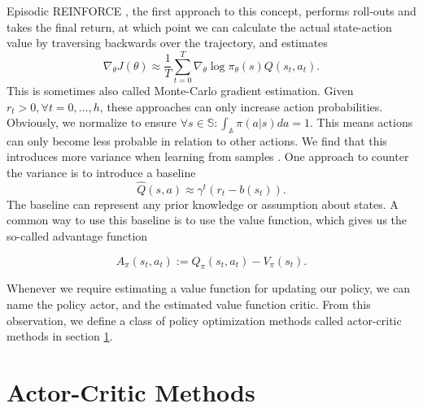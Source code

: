 Episodic REINFORCE \cite{Williams92simplestatistical}, the first approach to this concept, performs roll-outs and takes the final return, at which point we can calculate the actual state-action value by traversing backwards over the trajectory, and estimates
\begin{equation}
  \nabla_\theta J(\theta) \approx \frac{1}{T} \sum_{t=0}^T \nabla_\theta\log\pi_\theta(s) Q(s_t,a_t).
\end{equation}
This is sometimes also called Monte-Carlo gradient estimation. 
Given $r_t > 0, \forall t=0,\dots,h$, these approaches can only increase action probabilities. 
Obviously, we normalize to ensure $\forall s \in \mathbb{S}: \int_\mathbb{A}{\pi(a|s)da} = 1$. 
This means actions can only become less probable in relation to other actions. 
We find that this introduces more variance when learning from samples \cite{Sutton:1999:PGM:3009657.3009806}. 
One approach to counter the variance is to introduce a baseline
\begin{equation}
  \hat{Q}(s,a) \approx \gamma^{t} (r_{t} - b(s_t)).
\end{equation}
The baseline can represent any prior knowledge or assumption about states. 
A common way to use this baseline is to use the value function, which gives us the so-called advantage function

\begin{equation}
	A_{\pi}(s_t, a_t) := Q_{\pi}(s_t, a_t) - V_{\pi}(s_t).
	\label{eqn:adv}
\end{equation}

Whenever we require estimating a value function for updating our policy, we can name the policy actor, and the estimated value function critic. 
From this observation, we define a class of policy optimization methods called actor-critic methods in section \ref{sec:ac}.


\section{Actor-Critic Methods} 
\label{sec:ac}

